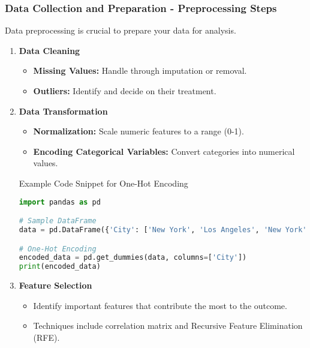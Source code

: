 \documentclass{beamer}
\begin{document}
\begin{frame}[fragile]
    \frametitle{Data Collection and Preparation - Preprocessing Steps}
    Data preprocessing is crucial to prepare your data for analysis. 
    \begin{enumerate}
        \item \textbf{Data Cleaning}
        \begin{itemize}
            \item \textbf{Missing Values:} Handle through imputation or removal.
            \item \textbf{Outliers:} Identify and decide on their treatment.
        \end{itemize}
        \item \textbf{Data Transformation}
        \begin{itemize}
            \item \textbf{Normalization:} Scale numeric features to a range (0-1).
            \item \textbf{Encoding Categorical Variables:} Convert categories into numerical values. 
        \end{itemize}
        \begin{block}{Example Code Snippet for One-Hot Encoding}
            \begin{lstlisting}[language=Python]
import pandas as pd

# Sample DataFrame
data = pd.DataFrame({'City': ['New York', 'Los Angeles', 'New York']})

# One-Hot Encoding
encoded_data = pd.get_dummies(data, columns=['City'])
print(encoded_data)
            \end{lstlisting}
        \end{block}
        \item \textbf{Feature Selection}
        \begin{itemize}
            \item Identify important features that contribute the most to the outcome.
            \item Techniques include correlation matrix and Recursive Feature Elimination (RFE).
        \end{itemize}
    \end{enumerate}
\end{frame}
\end{document}
